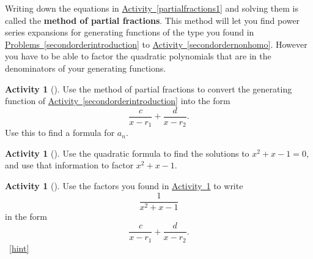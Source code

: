 \documentclass[10pt,]{book}
\newcommand{\terminology}[1]{\textbf{#1}}
\theoremstyle{plain}
\theoremstyle{definition}
\theoremstyle{definition}
\theoremstyle{definition}
\newtheorem{activity}[project]{Activity}
\numberwithin{equation}{chapter}
\begin{document}
\hypertarget{p-947}{}%
Writing down the equations in \hyperref[partialfractions1]{Activity~\ref{partialfractions1}} and solving them is called the \terminology{method of partial fractions}. This method will let you find power series expansions for generating functions of the type you found in \hyperref[secondorderintroduction]{Problems~\ref{secondorderintroduction}} to \hyperref[secondordernonhomo]{Activity~\ref{secondordernonhomo}}. However you have to be able to factor the quadratic polynomials that are in the denominators of your generating functions.%
\begin{activity}[]\label{activity-204}
\hypertarget{p-948}{}%
Use the method of partial fractions to convert the generating function of \hyperref[secondorderintroduction]{Activity~\ref{secondorderintroduction}} into the form%
\begin{equation*}
\frac{c}{x-r_1} + \frac{d}{x-r_2}\text{.}
\end{equation*}
Use this to find a formula for \(a_n\).%
\end{activity}
\begin{activity}[]\label{factorFibonacci}
\hypertarget{p-950}{}%
Use the quadratic formula to find the solutions to \(x^2+x-1=0\), and use that information to factor \(x^2+x-1\).%
\end{activity}
\begin{activity}[]\label{fractionFibonacci}
\hypertarget{p-952}{}%
Use the factors you found in \hyperref[factorFibonacci]{Activity~\ref{factorFibonacci}} to write%
\begin{equation*}
\frac{1}{x^2+x-1}
\end{equation*}
in the form%
\begin{equation*}
\frac{c}{x-r_1} + \frac{d}{x-r_2}.
\end{equation*}
%
~\hfill{\tiny\hyperlink{a-206}{[hint]}\hypertarget{q-206}{}}\end{activity}
\end{document}
